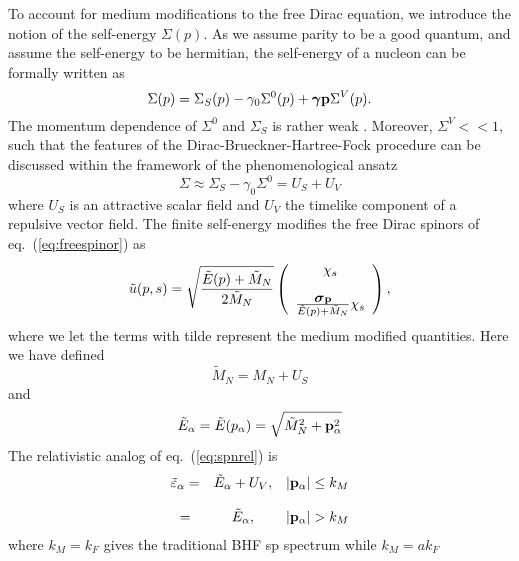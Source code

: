 To account for medium modifications to the free Dirac equation,
we introduce the notion of the self-energy $\Sigma (p)$.
As we assume parity to be a good quantum, and assume the self-energy
to be hermitian, the self-energy of a
nucleon can be formally written as
\begin{equation}
       \Sigma(p) =
       \Sigma_S(p) -\gamma_0 \Sigma^0(p)
       +\mbox{\boldmath $\gamma$}{\bf p}\Sigma^V(p).
\end{equation}
The momentum dependence of $\Sigma^0$ and $\Sigma_S$ is
rather weak \cite{sw86}.
Moreover, $\Sigma^V << 1$, such
that the features of the Dirac-Brueckner-Hartree-Fock
procedure can be discussed within the framework of the phenomenological
ansatz
\begin{equation}
\Sigma \approx \Sigma_S -\gamma_0 \Sigma^0 = U_S + U_V
\end{equation}
where $U_S$ is an attractive scalar field and $U_V$ the timelike component
of a repulsive vector field.
The finite self-energy modifies the
free Dirac spinors of eq.\ (\ref{eq:freespinor}) as
\begin{equation}
   \tilde{u}(p,s)=\sqrt{\frac{\tilde{E}(p)+\tilde{M}_N}{2\tilde{M}_N}}
	  \left(\begin{array}{c} \chi_s\\ \\
	  \frac{\mbox{\boldmath $\sigma$}{\bf p}}{\tilde{E}(p)+\tilde{M}_N}\chi_s
	  \end{array}\right),
\end{equation}
where we let the terms with tilde represent the medium modified quantities.
Here we have defined \cite{bm90,sw86}
\begin{equation}
   \tilde{M}_N=M_N+U_S
\end{equation}
and
\begin{equation}
      \tilde{E}_{\alpha}=
      \tilde{E}(p_{\alpha})=\sqrt{\tilde{M}_N^2+{\bf p}_{\alpha}^2}
\end{equation}
The relativistic analog of eq.\ (\ref{eq:spnrel}) is \cite{bm90}
\begin{equation}
  \begin{array}{ccc}
   \tilde{\varepsilon}_{\alpha}=&\tilde{E}_{\alpha} +U_V,
   &|{\bf p}_{\alpha}|\leq k_M\\
   &&\\
  =&\tilde{E}_{\alpha}, &|{\bf p}_{\alpha}|> k_M \\
  \end{array}
\end{equation}
where $k_M=k_F$ gives the traditional BHF sp spectrum while $k_M=ak_F$
